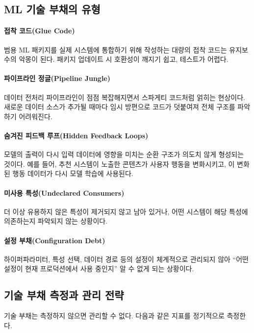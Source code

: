 \subsection{ML 기술 부채의 유형}
\label{sec:10.7.1}

\paragraph{접착 코드(Glue Code)}
범용 ML 패키지를 실제 시스템에 통합하기 위해 작성하는 대량의 접착 코드는 유지보수의 악몽이 된다. 패키지 업데이트 시 호환성이 깨지기 쉽고, 테스트가 어렵다.

\paragraph{파이프라인 정글(Pipeline Jungle)}
데이터 전처리 파이프라인이 점점 복잡해지면서 스파게티 코드처럼 얽히는 현상이다. 새로운 데이터 소스가 추가될 때마다 임시 방편으로 코드가 덧붙여져 전체 구조를 파악하기 어려워진다.

\paragraph{숨겨진 피드백 루프(Hidden Feedback Loops)}
모델의 출력이 다시 입력 데이터에 영향을 미치는 순환 구조가 의도치 않게 형성되는 것이다. 예를 들어, 추천 시스템이 노출한 콘텐츠가 사용자 행동을 변화시키고, 이 변화된 행동 데이터가 다시 모델 학습에 사용된다.

\paragraph{미사용 특성(Undeclared Consumers)}
더 이상 유용하지 않은 특성이 제거되지 않고 남아 있거나, 어떤 시스템이 해당 특성에 의존하는지 파악되지 않는 상황이다.

\paragraph{설정 부채(Configuration Debt)}
하이퍼파라미터, 특성 선택, 데이터 경로 등의 설정이 체계적으로 관리되지 않아 ``어떤 설정이 현재 프로덕션에서 사용 중인지'' 알 수 없게 되는 상황이다.

\subsection{기술 부채 측정과 관리 전략}
\label{sec:10.7.2}

기술 부채는 측정하지 않으면 관리할 수 없다. 다음과 같은 지표를 정기적으로 측정한다.

